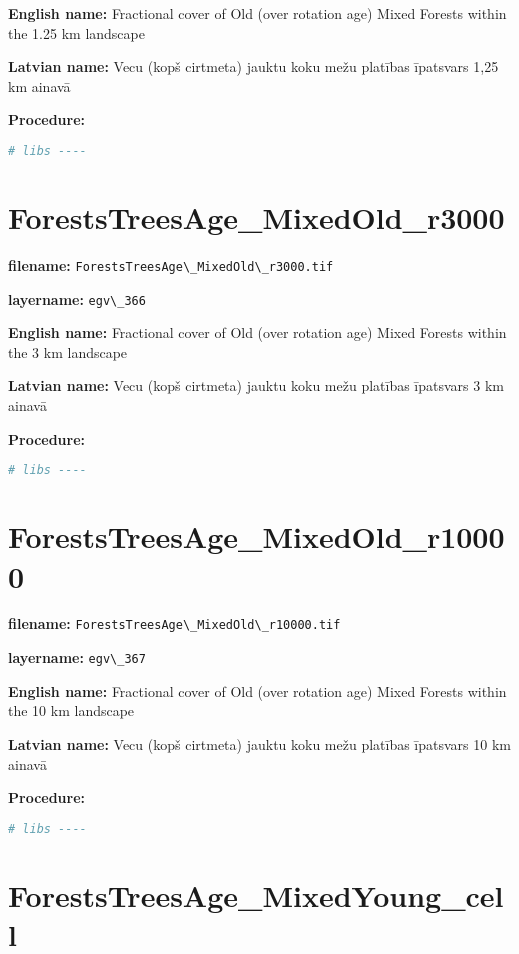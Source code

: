 \documentclass[
]{book}
\newcommand{\passthrough}[1]{#1}
\begin{document}
\textbf{English name:} Fractional cover of Old (over rotation age) Mixed Forests within the 1.25 km landscape

\textbf{Latvian name:} Vecu (kopš cirtmeta) jauktu koku mežu platības īpatsvars 1,25 km ainavā

\textbf{Procedure:}

\begin{lstlisting}[language=R]
# libs ----
\end{lstlisting}

\section{ForestsTreesAge\_MixedOld\_r3000}\label{ch06.366}

\textbf{filename:} \passthrough{\lstinline!ForestsTreesAge\_MixedOld\_r3000.tif!}

\textbf{layername:} \passthrough{\lstinline!egv\_366!}

\textbf{English name:} Fractional cover of Old (over rotation age) Mixed Forests within the 3 km landscape

\textbf{Latvian name:} Vecu (kopš cirtmeta) jauktu koku mežu platības īpatsvars 3 km ainavā

\textbf{Procedure:}

\begin{lstlisting}[language=R]
# libs ----
\end{lstlisting}

\section{ForestsTreesAge\_MixedOld\_r10000}\label{ch06.367}

\textbf{filename:} \passthrough{\lstinline!ForestsTreesAge\_MixedOld\_r10000.tif!}

\textbf{layername:} \passthrough{\lstinline!egv\_367!}

\textbf{English name:} Fractional cover of Old (over rotation age) Mixed Forests within the 10 km landscape

\textbf{Latvian name:} Vecu (kopš cirtmeta) jauktu koku mežu platības īpatsvars 10 km ainavā

\textbf{Procedure:}

\begin{lstlisting}[language=R]
# libs ----
\end{lstlisting}

\section{ForestsTreesAge\_MixedYoung\_cell}\label{ch06.368}
\end{document}
